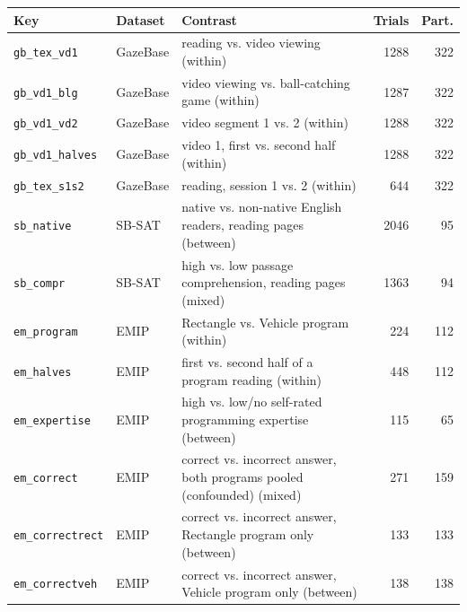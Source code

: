 \begin{tabular}{lllrr}
\toprule
Key & Dataset & Contrast & Trials & Part. \\
\midrule
\texttt{gb\_tex\_vd1} & GazeBase & reading vs. video viewing (within) & 1288 & 322 \\
\texttt{gb\_vd1\_blg} & GazeBase & video viewing vs. ball-catching game (within) & 1287 & 322 \\
\texttt{gb\_vd1\_vd2} & GazeBase & video segment 1 vs. 2 (within) & 1288 & 322 \\
\texttt{gb\_vd1\_halves} & GazeBase & video 1, first vs. second half (within) & 1288 & 322 \\
\texttt{gb\_tex\_s1s2} & GazeBase & reading, session 1 vs. 2 (within) & 644 & 322 \\
\texttt{sb\_native} & SB-SAT & native vs. non-native English readers, reading pages (between) & 2046 & 95 \\
\texttt{sb\_compr} & SB-SAT & high vs. low passage comprehension, reading pages (mixed) & 1363 & 94 \\
\texttt{em\_program} & EMIP & Rectangle vs. Vehicle program (within) & 224 & 112 \\
\texttt{em\_halves} & EMIP & first vs. second half of a program reading (within) & 448 & 112 \\
\texttt{em\_expertise} & EMIP & high vs. low/no self-rated programming expertise (between) & 115 & 65 \\
\texttt{em\_correct} & EMIP & correct vs. incorrect answer, both programs pooled (confounded) (mixed) & 271 & 159 \\
\texttt{em\_correctrect} & EMIP & correct vs. incorrect answer, Rectangle program only (between) & 133 & 133 \\
\texttt{em\_correctveh} & EMIP & correct vs. incorrect answer, Vehicle program only (between) & 138 & 138 \\
\bottomrule
\end{tabular}
